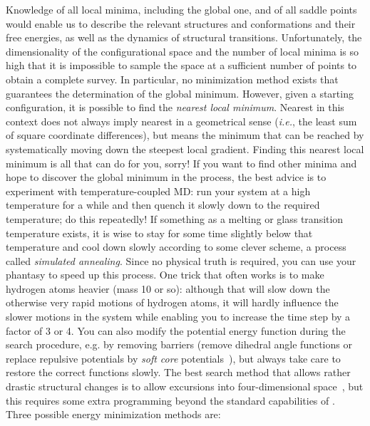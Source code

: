 Knowledge of all local minima, including the global one, and of all
saddle points would enable us to describe the relevant structures and
conformations and their free energies, as well as the dynamics of
structural transitions. Unfortunately, the dimensionality of the
configurational space and the number of local minima is so high that
it is impossible to sample the space at a sufficient number of points
to obtain a complete survey. In particular, no minimization method
exists that guarantees the determination of the global
minimum. However, given a starting configuration, it is possible to
find the {\em nearest local minimum}. Nearest in this context does not
always imply nearest in a geometrical sense ({\em i.e.}, the least sum
of square coordinate differences), but means the minimum that can be
reached by systematically moving down the steepest local
gradient. Finding this nearest local minimum is all that {\gromacs}
can do for you, sorry! If you want to find other minima and hope to
discover the global minimum in the process, the best advice is to
experiment with temperature-coupled MD: run your system at a high
temperature for a while and then quench it slowly down to the required
temperature; do this repeatedly!  If something as a melting or glass
transition temperature exists, it is wise to stay for some time
slightly below that temperature and cool down slowly according to some
clever scheme, a process called {\em simulated annealing}. Since no
physical truth is required, you can use your phantasy to speed up this
process. One trick that often works is to make hydrogen atoms heavier
(mass 10 or so): although that will slow down the otherwise very rapid
motions of hydrogen atoms, it will hardly influence the slower motions
in the system while enabling you to increase the time step by a factor
of 3 or 4. You can also modify the potential energy function during
the search procedure, e.g. by removing barriers (remove dihedral angle
functions or replace repulsive potentials by {\em soft core}
potentials~\cite{Nilges88}), but always take care to restore the
correct functions slowly. The best search method that allows rather
drastic structural changes is to allow excursions into
four-dimensional space~\cite{Schaik93}, but this requires some extra
programming beyond the standard capabilities of {\gromacs}. \\
Three possible energy minimization methods are:
